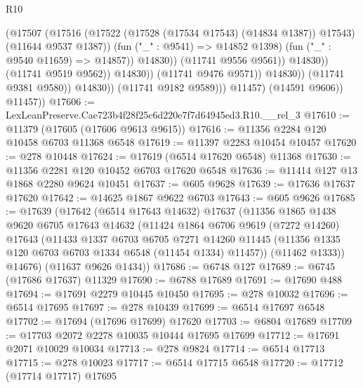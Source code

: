 \begin{lexlean}{R10}
\begin{coremodule}
                                            (@17507
                                              (@17516
                                                (@17522
                                                  (@17528 (@17534 @17543) (@14834 @1387))
                                                  @17543)
                                                (@11644 @9537 @1387))
                                              (fun ("_" : @9541) => @14852 @1398)
                                              (fun ("_" : @9540 @11659) => @14857))
                                            @14830))
                                        (@11741 @9556 @9561))
                                      @14830))
                                  (@11741 @9519 @9562))
                                @14830))
                            (@11741 @9476 @9571))
                          @14830))
                      (@11741 @9381 @9580))
                    @14830))
                (@11741 @9182 @9589)))
            @11457)
          (@14591 @9606))
        @11457))
@17606 := LexLeanPreserve.Cae723b4f28f25c6d220e7f7d64945ed3.R10.__rel_3
@17610 := @11379 (@17605 (@17606 @9613 @9615))
@17616 := @11356 @2284 @120 @10458 @6703 @11368 @6548
@17619 := @11397 @2283 @10454 @10457
@17620 := @278 @10448
@17624 := @17619 (@6514 @17620 @6548) @11368
@17630 := @11356 @2281 @120 @10452 @6703 @17620 @6548
@17636 := @11414 @127 @13 @1868 @2280 @9624 @10451
@17637 := @605 @9628
@17639 := @17636 @17637 @17620
@17642 := @14625 @1867 @9622 @6703
@17643 := @605 @9626
@17685 := @17639
    (@17642
      (@6514 @17643 @14632)
      @17637
      (@11356
        @1865
        @1438
        @9620
        @6705
        @17643
        @14632
        (@11424
          @1864
          @6706
          @9619
          (@7272 @14260)
          @17643
          (@11433
            @1337
            @6703
            @6705
            @7271
            @14260
            @11445
            (@11356 @1335 @120 @6703 @6703 @1334 @6548 (@11454 @1334) @11457))
          (@11462 @1333))
        @14676)
      (@11637 @9626 @1434))
@17686 := @6748 @127
@17689 := @6745 (@17686 @17637) @11329
@17690 := @6788 @17689
@17691 := @17690 @488
@17694 := @17691 @2279 @10445 @10450
@17695 := @278 @10032
@17696 := @6514 @17695
@17697 := @278 @10439
@17699 := @6514 @17697 @6548
@17702 := @17694 (@17696 @17699) @17620
@17703 := @6804 @17689
@17709 := @17703 @2072 @2278 @10035 @10444 @17695 @17699
@17712 := @17691 @2071 @10029 @10034
@17713 := @278 @9824
@17714 := @6514 @17713
@17715 := @278 @10023
@17717 := @6514 @17715 @6548
@17720 := @17712 (@17714 @17717) @17695

\end{coremodule}
\end{lexlean}
